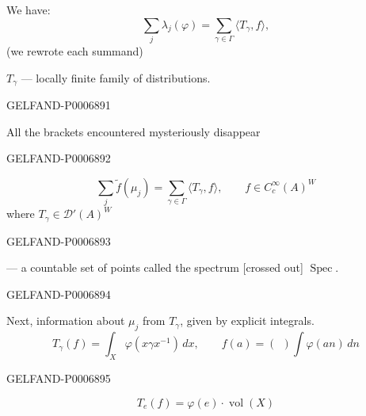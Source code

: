 We have:
\[
\sum_j\lambda_j(\varphi)=\sum_{\gamma\in\Gamma}\langle T_\gamma,f\rangle,
\]
(we rewrote each summand)

\(T_\gamma\) --- locally finite family of distributions.


\begin{GelfandAdjacentEvidence}{GELFAND-P000689}{1}

All the brackets encountered mysteriously disappear
\end{GelfandAdjacentEvidence}
\begin{GelfandAdjacentEvidence}{GELFAND-P000689}{2}

\[
\sum_j\widetilde f(\mu_j)
=\sum_{\gamma\in\Gamma}\langle T_\gamma,f\rangle,\qquad
f\in C_c^\infty(A)^W
\]
where \(T_\gamma\in\mathcal D'(A)^W\)

\end{GelfandAdjacentEvidence}
\begin{GelfandAdjacentEvidence}{GELFAND-P000689}{3}

--- a countable set of points called the spectrum [crossed out] \underline{\(\operatorname{Spec}\)}.
\end{GelfandAdjacentEvidence}
\begin{GelfandAdjacentEvidence}{GELFAND-P000689}{4}


Next, information about \(\mu_j\) from \(T_\gamma\), given by explicit integrals.
\[
T_\gamma(f)=\int_X\varphi(x\gamma x^{-1})\,dx,\qquad
f(a)=(\ \ )\int\varphi(an)\,dn
\]
\end{GelfandAdjacentEvidence}
\begin{GelfandAdjacentEvidence}{GELFAND-P000689}{5}

\[
T_e(f)=\varphi(e)\cdot\operatorname{vol}(X)
\]
\end{GelfandAdjacentEvidence}
